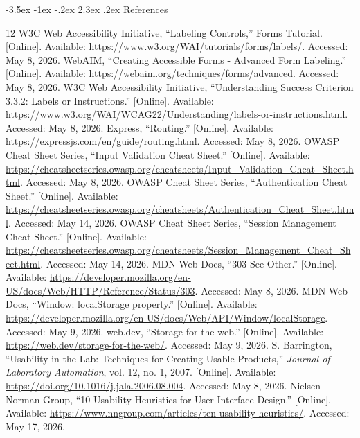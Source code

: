 ﻿\documentclass[12pt,a4paper]{article}
\makeatletter
\renewcommand\section{\@startsection{section}{1}{\z@}%
  {-3.5ex \@plus -1ex \@minus -.2ex}%
  {2.3ex \@plus .2ex}%
  {\normalfont\bfseries\fontsize{14}{16}\selectfont}}
\makeatother
\begin{document}
\section{References}
\renewcommand{\refname}{}
\vspace{-2em}
\begin{thebibliography}{12}
 W3C Web Accessibility Initiative, ``Labeling Controls,'' Forms Tutorial. [Online]. Available: \url{https://www.w3.org/WAI/tutorials/forms/labels/}. Accessed: May 8, 2026.
 WebAIM, ``Creating Accessible Forms - Advanced Form Labeling.'' [Online]. Available: \url{https://webaim.org/techniques/forms/advanced}. Accessed: May 8, 2026.
 W3C Web Accessibility Initiative, ``Understanding Success Criterion 3.3.2: Labels or Instructions.'' [Online]. Available: \url{https://www.w3.org/WAI/WCAG22/Understanding/labels-or-instructions.html}. Accessed: May 8, 2026.
 Express, ``Routing.'' [Online]. Available: \url{https://expressjs.com/en/guide/routing.html}. Accessed: May 8, 2026.
 OWASP Cheat Sheet Series, ``Input Validation Cheat Sheet.'' [Online]. Available: \url{https://cheatsheetseries.owasp.org/cheatsheets/Input_Validation_Cheat_Sheet.html}. Accessed: May 8, 2026.
 OWASP Cheat Sheet Series, ``Authentication Cheat Sheet.'' [Online]. Available: \url{https://cheatsheetseries.owasp.org/cheatsheets/Authentication_Cheat_Sheet.html}. Accessed: May 14, 2026.
 OWASP Cheat Sheet Series, ``Session Management Cheat Sheet.'' [Online]. Available: \url{https://cheatsheetseries.owasp.org/cheatsheets/Session_Management_Cheat_Sheet.html}. Accessed: May 14, 2026.
 MDN Web Docs, ``303 See Other.'' [Online]. Available: \url{https://developer.mozilla.org/en-US/docs/Web/HTTP/Reference/Status/303}. Accessed: May 8, 2026.
 MDN Web Docs, ``Window: localStorage property.'' [Online]. Available: \url{https://developer.mozilla.org/en-US/docs/Web/API/Window/localStorage}. Accessed: May 9, 2026.
 web.dev, ``Storage for the web.'' [Online]. Available: \url{https://web.dev/storage-for-the-web/}. Accessed: May 9, 2026.
 S. Barrington, ``Usability in the Lab: Techniques for Creating Usable Products,'' \textit{Journal of Laboratory Automation}, vol. 12, no. 1, 2007. [Online]. Available: \url{https://doi.org/10.1016/j.jala.2006.08.004}. Accessed: May 8, 2026.
 Nielsen Norman Group, ``10 Usability Heuristics for User Interface Design.'' [Online]. Available: \url{https://www.nngroup.com/articles/ten-usability-heuristics/}. Accessed: May 17, 2026.
\end{thebibliography}
\end{document}
